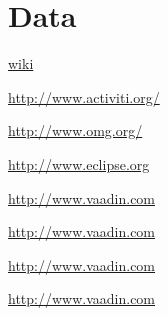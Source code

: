 \documentclass[paper=a4,twoside=false,BCOR=0mm,DIV=calc,fontsize=12pt]{scrartcl}
\begin{document}
\section{Data}





\begin{thebibliography}{99}

 \url{wiki}

 \url{http://www.activiti.org/}

 \url{http://www.omg.org/}

 \url{http://www.eclipse.org} %

 \url{http://www.vaadin.com}

 \url{http://www.vaadin.com}

 \url{http://www.vaadin.com}

 \url{http://www.vaadin.com}

 \url{} %


 \url{}

 \url{}

 \url{}

 \url{}

 \url{}

 \url{}

 \url{}

 \url{}

 \url{}



\end{thebibliography}
\end{document}
